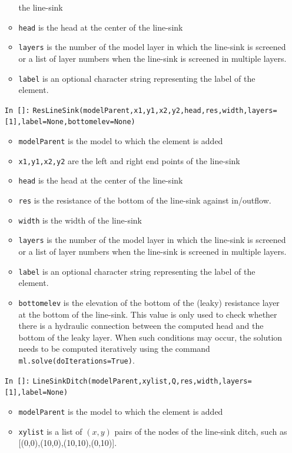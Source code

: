 \documentclass [10pt,letterpaper] {article}
\begin{document}
\begin{itemize}
\begin{itemize}
    the line-sink
    \item {\tt head} is the head at the center of the line-sink
    \item {\tt layers} is the number of the model layer in which the line-sink is screened or a list of layer numbers when the line-sink is screened in multiple layers. 
    \item {\tt label} is an optional character string representing the label of the element.
    \end{itemize}
\item[{\tt In []:}] {\tt ResLineSink(modelParent,x1,y1,x2,y2,head,res,width,layers=[1],label=None,bottomelev=None)}
    \begin{itemize}
    \item {\tt modelParent} is the model to which the element is
    added
    \item {\tt x1,y1,x2,y2} are the left and right end points of
    the line-sink
    \item {\tt head} is the head at the center of the line-sink
    \item {\tt res} is the resistance of the bottom of the line-sink against in/outflow.
    \item {\tt width} is the width of the line-sink
    \item {\tt layers} is the number of the model layer in which the line-sink is screened or a list of layer numbers when the line-sink is screened in multiple layers. 
    \item {\tt label} is an optional character string representing the label of the element.
    \item {\tt bottomelev} is the elevation of the bottom of the (leaky) resistance layer at the bottom of the line-sink.
    This value is only used to check whether there is a hydraulic connection between the computed head and the bottom
    of the leaky layer. When such conditions may occur, the solution needs to be computed iteratively using the
    command {\tt ml.solve(doIterations=True)}.
    \end{itemize}
\item[{\tt In []:}] {\tt LineSinkDitch(modelParent,xylist,Q,res,width,layers=[1],label=None)}
    \begin{itemize}
    \item {\tt modelParent} is the model to which the element is
    added
    \item {\tt xylist} is a list of $(x,y)$ pairs of the nodes of
    the line-sink ditch, such as
    [(0,0),(10,0),(10,10),(0,10)].

\end{itemize}
\end{itemize}
\end{document}
